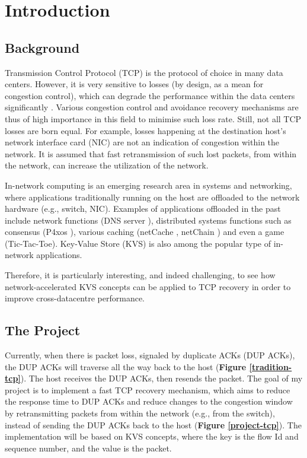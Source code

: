 \section*{\fontsize{18pt}{1}\selectfont Introduction}

\subsection*{Background}

Transmission Control Protocol (TCP) is the protocol of choice in many data centers. However, it is very sensitive to losses (by design, as a mean for congestion control), which can degrade the performance within the data centers significantly \cite{zilberman2017has}. Various congestion control and avoidance recovery mechanisms are thus of high importance in this field to minimise such loss rate. Still, not all TCP losses are born equal. For example, losses happening at the destination host's network interface card (NIC) are not an indication of congestion within the network. It is assumed that fast retransmission of such lost packets, from within the network, can increase the utilization of the network.

 In-network computing is an emerging research area in systems and networking, where applications traditionally running on the host are offloaded to the network hardware (e.g., switch, NIC). Examples of applications offloaded in the past include network functions (DNS server \cite{dns}), distributed systems functions such as consensus (P4xos \cite{p4xos}), various caching (netCache \cite{netCache}, netChain \cite{netChain}) and even a game (Tic-Tac-Toe). Key-Value Store (KVS) is also among the popular type of in-network applications. 
 
 Therefore, it is particularly interesting, and indeed challenging, to see how network-accelerated KVS concepts can be applied to TCP recovery in order to improve cross-datacentre performance.
 
 \subsection*{The Project}
 Currently, when there is packet loss, signaled by duplicate ACKs (DUP ACKs), the DUP ACKs will traverse all the way back to the host (\textbf{Figure \ref{tradition-tcp}}). The host receives the DUP ACKs, then resends the packet. The goal of my project is to implement a fast TCP recovery mechanism, which aims to reduce the response time to DUP ACKs and reduce changes to the congestion window by retransmitting packets from within the network (e.g., from the switch), instead of sending the DUP ACKs back to the host (\textbf{Figure \ref{project-tcp}}). The implementation will be based on KVS concepts, where the key is the flow Id and sequence number, and the value is the packet.
 
